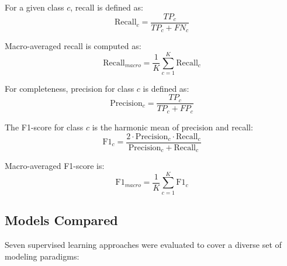 \documentclass[sigconf]{acmart}
\begin{document}
For a given class $c$, recall is defined as:
\begin{equation}
\label{eq:recall}
\text{Recall}_c = \frac{TP_c}{TP_c + FN_c}
\end{equation}

Macro-averaged recall is computed as:
\begin{equation}
\label{eq:macro_recall}
\text{Recall}_{macro} = \frac{1}{K} \sum_{c=1}^{K} \text{Recall}_c
\end{equation}

For completeness, precision for class $c$ is defined as:
\begin{equation}
\label{eq:precision}
\text{Precision}_c = \frac{TP_c}{TP_c + FP_c}
\end{equation}

The F1-score for class $c$ is the harmonic mean of precision and recall:
\begin{equation}
\label{eq:f1}
\text{F1}_c = \frac{2 \cdot \text{Precision}_c \cdot \text{Recall}_c}{\text{Precision}_c + \text{Recall}_c}
\end{equation}

Macro-averaged F1-score is:
\begin{equation}
\label{eq:macro_f1}
\text{F1}_{macro} = \frac{1}{K} \sum_{c=1}^{K} \text{F1}_c
\end{equation}

\subsection{Models Compared}
\label{subsec:models}

Seven supervised learning approaches were evaluated to cover a diverse set of modeling paradigms:
\end{document}
